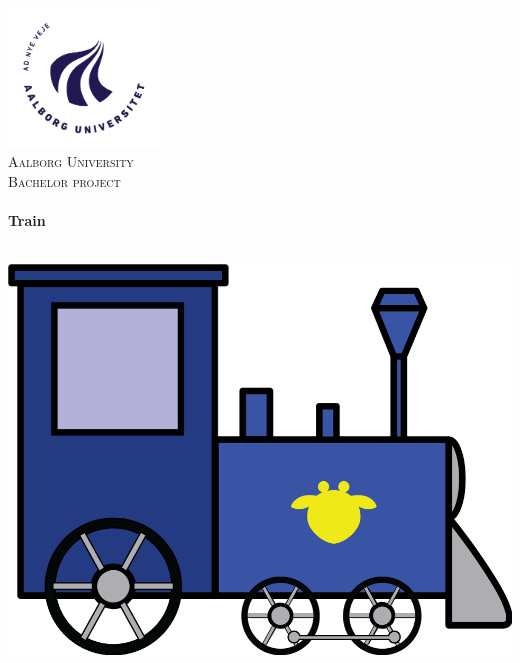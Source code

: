 \begin{titlingpage}\centering
\includegraphics[width=0.30\textwidth]{img/titelblad/AAU_logo_2012}~\\[0.5cm]

\textsc{\LARGE Aalborg University}\\[0.3cm]

\textsc{\Large Bachelor project}\\[0.3cm]

\HRule \\[0.4cm]
{\Huge \bfseries Train}

\HRule \\[2cm]


\includegraphics[width=\textwidth]{img/train}

\end{titlingpage}
